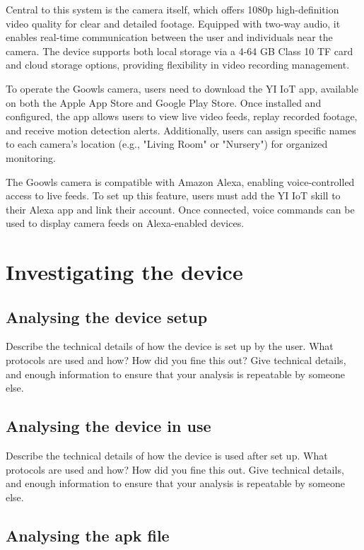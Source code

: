 \documentclass[11pt]{article}
\begin{document}
Central to this system is the camera itself, which offers 1080p high-definition video quality for clear and detailed footage. Equipped with two-way audio, it enables real-time communication between the user and individuals near the camera. The device supports both local storage via a 4-64 GB Class 10 TF card and cloud storage options, providing flexibility in video recording management.

To operate the Goowls camera, users need to download the YI IoT app, available on both the Apple App Store and Google Play Store. Once installed and configured, the app allows users to view live video feeds, replay recorded footage, and receive motion detection alerts. Additionally, users can assign specific names to each camera's location (e.g., "Living Room" or "Nursery") for organized monitoring.

The Goowls camera is compatible with Amazon Alexa, enabling voice-controlled access to live feeds. To set up this feature, users must add the YI IoT skill to their Alexa app and link their account. Once connected, voice commands can be used to display camera feeds on Alexa-enabled devices.

\section{Investigating the device}

\subsection{Analysing the device setup}

Describe the technical details of how the device is set up by the user. What protocols are used and how? How did you fine this out? Give technical details, and enough information to ensure that your analysis is repeatable by someone else.

\subsection{Analysing the device in use}

Describe the technical details of how the device is used after set up. What protocols are used and how? How did you fine this out. Give technical details, and enough information to ensure that your analysis is repeatable by someone else.

\subsection{Analysing the apk file}
\end{document}
